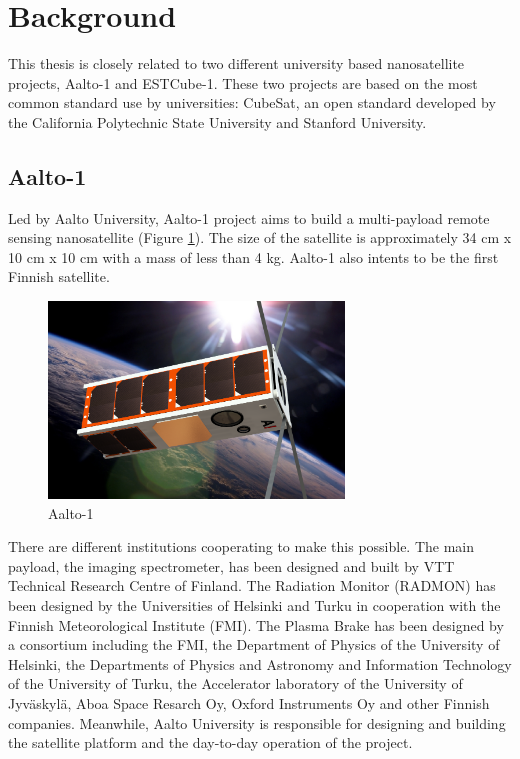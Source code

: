 \section{Background}\label{1.1}

This thesis is closely related to two different university based nanosatellite projects, Aalto-1 and ESTCube-1. These two projects are based on the most common standard use by universities: CubeSat\cite{CubeSat}, an open standard developed by the California Polytechnic State University and Stanford University.


\subsection{Aalto-1}

Led by Aalto University, Aalto-1 project aims to build a multi-payload remote sensing nanosatellite (Figure \ref{f1.4}). The size of the satellite is approximately 34 cm x 10 cm x 10 cm with a mass of less than 4 kg\cite{AALTO1a}. Aalto-1 also intents to be the first Finnish satellite.

\begin{figure}[H]
\centerline{\includegraphics[width=0.7\textwidth]{images/aalto1.png}}
\caption{Aalto-1}
\label{f1.4}
\end{figure}


There are different institutions cooperating to make this possible. The main payload, the imaging spectrometer, has been designed and built by VTT Technical Research Centre of Finland. The Radiation Monitor (RADMON) has been designed by the Universities of Helsinki and Turku in cooperation with the Finnish Meteorological Institute (FMI). The Plasma Brake has been designed by a consortium including the FMI, the Department of Physics of the University of Helsinki, the Departments of Physics and Astronomy and Information Technology of the University of Turku, the Accelerator laboratory of the University of Jyväskylä, Aboa Space Resarch Oy, Oxford Instruments Oy and other Finnish companies. Meanwhile, Aalto University is responsible for designing and building the satellite platform and the day-to-day operation of the project. \cite{AALTO1b}\\ 

